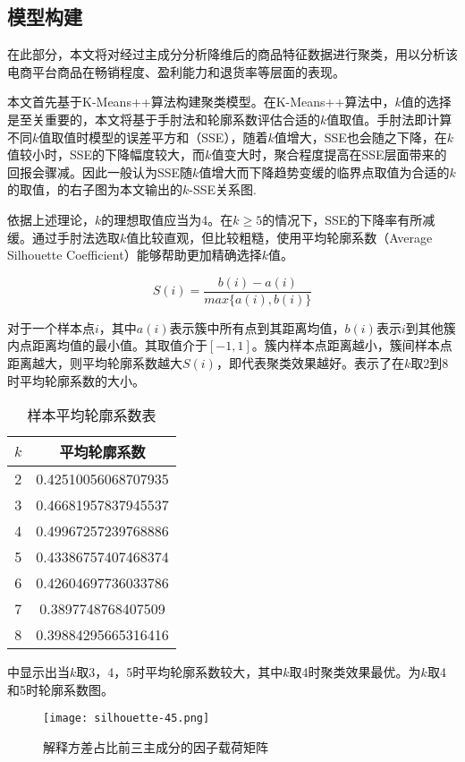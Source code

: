 \documentclass[lang=cn,11pt,a4paper,cite=authoryear]{elegantpaper}
\begin{document}
\subsection{模型构建}

在此部分，本文将对经过主成分分析降维后的商品特征数据进行聚类，用以分析该电商平台商品在畅销程度、盈利能力和退货率等层面的表现。

本文首先基于K-Means++算法构建聚类模型。在K-Means++算法中，$k$值的选择是至关重要的，本文将基于手肘法和轮廓系数评估合适的$k$值取值。手肘法即计算不同$k$值取值时模型的误差平方和（SSE），随着$k$值增大，SSE也会随之下降，在$k$值较小时，SSE的下降幅度较大，而$k$值变大时，聚合程度提高在SSE层面带来的回报会骤减。因此一般认为SSE随$k$值增大而下降趋势变缓的临界点取值为合适的$k$的取值，的右子图为本文输出的$k$-SSE关系图.

依据上述理论，$k$的理想取值应当为4。在$k \geqslant 5$的情况下，SSE的下降率有所减缓。通过手肘法选取$k$值比较直观，但比较粗糙，使用平均轮廓系数（Average Silhouette Coefficient）能够帮助更加精确选择$k$值。

\begin{equation}
  S(i) = \frac{b(i)-a(i)}{max \{a(i), b(i) \}}
\end{equation}

对于一个样本点$i$，其中$a(i)$表示簇中所有点到其距离均值，$b(i)$表示$i$到其他簇内点距离均值的最小值。其取值介于$[-1, 1]$。簇内样本点距离越小，簇间样本点距离越大，则平均轮廓系数越大$S(i)$，即代表聚类效果越好。表示了在$k$取2到8时平均轮廓系数的大小。
\begin{table}[!htb]
  \centering
  \caption{样本平均轮廓系数表}
    \huge
    \begin{tabular}{c|c}
    \hline
    \textbf{$k$} & \textbf{平均轮廓系数} \\
    \hline
    2 & 0.42510056068707935 \\
    3 & 0.46681957837945537 \\
    4 & 0.49967257239768886 \\
    5 & 0.43386757407468374 \\
    6 & 0.42604697736033786 \\
    7 & 0.3897748768407509  \\
    8 & 0.39884295665316416 \\
    \hline
    \end{tabular}
  \label{平均轮廓系数表}
\end{table}

中显示出当$k$取3，4，5时平均轮廓系数较大，其中$k$取4时聚类效果最优。为$k$取4和5时轮廓系数图。
\begin{figure}[H]
  \centering
  \texttt{[image: silhouette-45.png]}
  \caption{解释方差占比前三主成分的因子载荷矩阵}
  \label{平均轮廓系数}
\end{figure}
\end{document}
